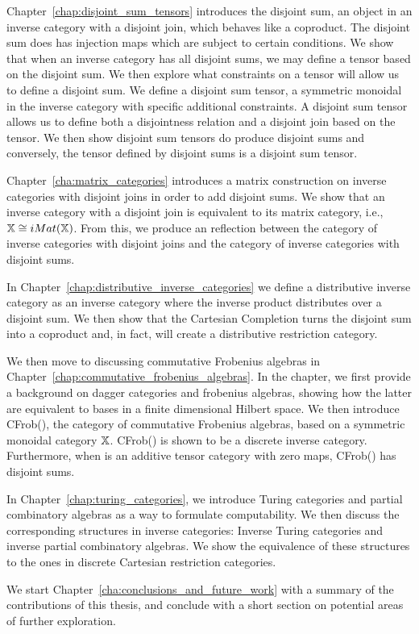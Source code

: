 Chapter~\ref{chap:disjoint_sum_tensors} introduces the disjoint sum, an object in an inverse
category with a disjoint join, which behaves like a coproduct. The disjoint sum does has injection
maps which are subject to certain conditions. We show that when an inverse category has all disjoint
sums, we may define a tensor based on the disjoint sum. We then explore what constraints on a tensor
will allow us to define a disjoint sum. We define a disjoint sum tensor, a symmetric monoidal in the
inverse category with specific additional constraints. A disjoint sum tensor allows us to define
both a disjointness relation and a disjoint join based on the tensor. We then show disjoint sum
tensors do produce disjoint sums and conversely, the tensor defined by disjoint sums is a disjoint
sum tensor.

Chapter~\ref{cha:matrix_categories} introduces a matrix construction on inverse categories with
disjoint joins in order to add disjoint sums. We show that an inverse category \X with a disjoint join
is equivalent to its matrix category, i.e., $\mathbb{X} \cong iMat({\mathbb{X}})$. From this,
we produce an reflection between the category of inverse categories with disjoint joins and the
category of inverse categories with disjoint sums.

In Chapter~\ref{chap:distributive_inverse_categories} we define a distributive inverse category as
an inverse category where the inverse product  distributes over a disjoint sum. We then show that
the Cartesian Completion turns the disjoint sum into a coproduct and, in fact, will create a
distributive restriction category.

We then move to discussing commutative Frobenius algebras in
Chapter~\ref{chap:commutative_frobenius_algebras}. In the chapter, we first provide
a background on dagger categories and frobenius algebras, showing how the latter are equivalent to
bases in a finite dimensional Hilbert space. We then introduce CFrob(\X), the category of
commutative Frobenius algebras, based on a symmetric monoidal category $\mathbb{X}$. CFrob(\X) is shown to
be a discrete inverse category. Furthermore, when \X is an additive tensor category with zero maps,
CFrob(\X) has disjoint sums.

In Chapter~\ref{chap:turing_categories}, we introduce Turing categories and partial combinatory
algebras as a way to formulate computability. We then discuss the corresponding structures in
inverse categories: Inverse Turing categories and inverse partial combinatory algebras. We show the
equivalence of these structures to the ones in discrete Cartesian restriction categories.

We start Chapter~\ref{cha:conclusions_and_future_work} with a summary of the contributions of this
thesis, and conclude with a short section on potential areas of further exploration.



